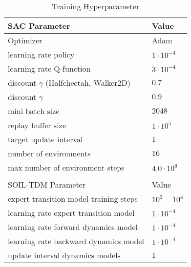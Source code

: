 \documentclass{article}
\begin{document}
\begin{table}[ht]
	\renewcommand{\arraystretch}{1.3}
	\centering
	\caption{Training Hyperparameter}\label{tb:sachyp}
	\begin{small}
	\begin{tabular}{l|l}
	    \hline
		SAC Parameter & Value \\\hline
		Optimizer & Adam\nocite{KingmaB14} \\
		learning rate policy & $1 \cdot 10^{-4}$ \\
		learning rate Q-function & $3 \cdot 10^{-4}$ \\
		discount $\gamma$ (Halfcheetah, Walker2D) & $0.7$ \\
		discount $\gamma$ & $0.9$ \\
		mini batch size & $2048$ \\
		replay buffer size & $1 \cdot 10^5$\\
		target update interval & $1$ \\
		number of environments & $16$ \\
		max number of environment steps & $4.0 \cdot 10^6$ \\
		\\\hline
		SOIL-TDM Parameter & Value \\\hline
		expert transition model training steps & $10^{3} - 10^{4}$ \\
		learning rate expert transition model & $1 \cdot 10^{-4}$ \\
		learning rate forward dynamics model & $1 \cdot 10^{-4}$ \\
		learning rate backward dynamics model & $1 \cdot 10^{-4}$ \\
		update interval dynamics models & $1$ \\
	\end{tabular}
	\end{small}
\end{table}
\end{document}
